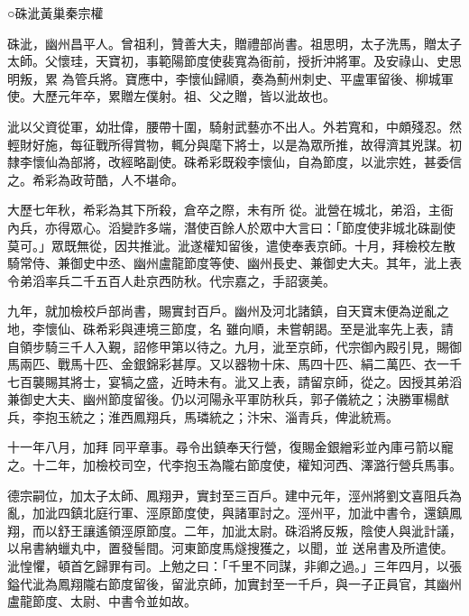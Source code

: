 
\begin{pinyinscope}

 ○硃泚黃巢秦宗權



 硃泚，幽州昌平人。曾祖利，贊善大夫，贈禮部尚書。祖思明，太子洗馬，贈太子太師。父懷珪，天寶初，事範陽節度使裴寬為衙前，授折沖將軍。及安祿山、史思明叛，累
 為管兵將。寶應中，李懷仙歸順，奏為薊州刺史、平盧軍留後、柳城軍使。大歷元年卒，累贈左僕射。祖、父之贈，皆以泚故也。



 泚以父資從軍，幼壯偉，腰帶十圍，騎射武藝亦不出人。外若寬和，中頗殘忍。然輕財好施，每征戰所得賞物，輒分與麾下將士，以是為眾所推，故得濟其兇謀。初隸李懷仙為部將，改經略副使。硃希彩既殺李懷仙，自為節度，以泚宗姓，甚委信之。希彩為政苛酷，人不堪命。



 大歷七年秋，希彩為其下所殺，倉卒之際，未有所
 從。泚營在城北，弟滔，主衙內兵，亦得眾心。滔變詐多端，潛使百餘人於眾中大言曰：「節度使非城北硃副使莫可。」眾既無從，因共推泚。泚遂權知留後，遣使奉表京師。十月，拜檢校左散騎常侍、兼御史中丞、幽州盧龍節度等使、幽州長史、兼御史大夫。其年，泚上表令弟滔率兵二千五百人赴京西防秋。代宗嘉之，手詔褒美。



 九年，就加檢校戶部尚書，賜實封百戶。幽州及河北諸鎮，自天寶末便為逆亂之地，李懷仙、硃希彩與連境三節度，名
 雖向順，未嘗朝謁。至是泚率先上表，請自領步騎三千人入覲，詔修甲第以待之。九月，泚至京師，代宗御內殿引見，賜御馬兩匹、戰馬十匹、金銀錦彩甚厚。又以器物十床、馬四十匹、絹二萬匹、衣一千七百襲賜其將士，宴犒之盛，近時未有。泚又上表，請留京師，從之。因授其弟滔兼御史大夫、幽州節度留後。仍以河陽永平軍防秋兵，郭子儀統之；決勝軍楊猷兵，李抱玉統之；淮西鳳翔兵，馬璘統之；汴宋、淄青兵，俾泚統焉。



 十一年八月，加拜
 同平章事。尋令出鎮奉天行營，復賜金銀繒彩並內庫弓箭以寵之。十二年，加檢校司空，代李抱玉為隴右節度使，權知河西、澤潞行營兵馬事。



 德宗嗣位，加太子太師、鳳翔尹，實封至三百戶。建中元年，涇州將劉文喜阻兵為亂，加泚四鎮北庭行軍、涇原節度使，與諸軍討之。涇州平，加泚中書令，還鎮鳳翔，而以舒王讓遙領涇原節度。二年，加泚太尉。硃滔將反叛，陰使人與泚計議，以帛書納蠟丸中，置發髻間。河東節度馬燧搜獲之，以聞，並
 送帛書及所遣使。泚惶懼，頓首乞歸罪有司。上勉之曰：「千里不同謀，非卿之過。」三年四月，以張鎰代泚為鳳翔隴右節度留後，留泚京師，加實封至一千戶，與一子正員官，其幽州盧龍節度、太尉、中書令並如故。




\end{pinyinscope}
